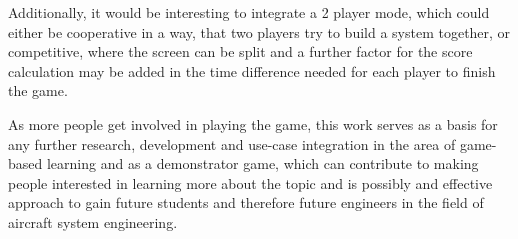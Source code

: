 Additionally, it would be interesting to integrate a 2 player mode, which could either be cooperative in a way, that two players
try to build a system together, or competitive, where the screen can be split and a further factor for the score calculation may be added in the time difference
needed for each player to finish the game.

As more people get involved in playing the game, this work serves as a basis for any further research, development and use-case integration in the area
of game-based learning and as a demonstrator game, which can contribute to making people interested in learning more about the topic and is possibly and effective
approach to gain future students and therefore future engineers in the field of aircraft system engineering.